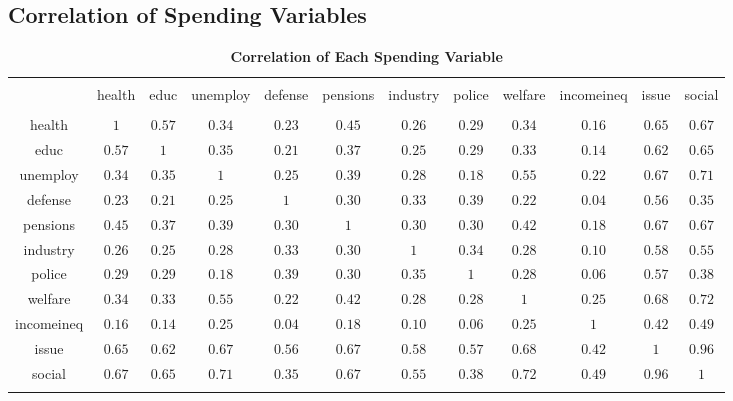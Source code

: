\documentclass[12pt, titlepage]{article}
\newcommand\tb{\textbf}
\begin{document}
\begin{landscape}
\section{Correlation of Spending Variables}

\begin{table}[H] \centering 
	\caption{\tb{Correlation of Each Spending Variable} }
	\label{Spending} 
	\begin{tabular}{ cccccccccccc} 
		\\[-1.8ex]\hline 
		\hline \\[-1.8ex] 
		& health & educ & unemploy & defense & pensions & industry & police & welfare & incomeineq & issue & social \\ 
		\hline \\[-1.8ex] 
		health & $1$ & $0.57$ & $0.34$ & $0.23$ & $0.45$ & $0.26$ & $0.29$ & $0.34$ & $0.16$ & $0.65$ & $0.67$ \\ 
		educ & $0.57$ & $1$ & $0.35$ & $0.21$ & $0.37$ & $0.25$ & $0.29$ & $0.33$ & $0.14$ & $0.62$ & $0.65$ \\ 
		unemploy & $0.34$ & $0.35$ & $1$ & $0.25$ & $0.39$ & $0.28$ & $0.18$ & $0.55$ & $0.22$ & $0.67$ & $0.71$ \\ 
		defense & $0.23$ & $0.21$ & $0.25$ & $1$ & $0.30$ & $0.33$ & $0.39$ & $0.22$ & $0.04$ & $0.56$ & $0.35$ \\ 
		pensions & $0.45$ & $0.37$ & $0.39$ & $0.30$ & $1$ & $0.30$ & $0.30$ & $0.42$ & $0.18$ & $0.67$ & $0.67$ \\ 
		industry & $0.26$ & $0.25$ & $0.28$ & $0.33$ & $0.30$ & $1$ & $0.34$ & $0.28$ & $0.10$ & $0.58$ & $0.55$ \\ 
		police & $0.29$ & $0.29$ & $0.18$ & $0.39$ & $0.30$ & $0.35$ & $1$ & $0.28$ & $0.06$ & $0.57$ & $0.38$ \\ 
		welfare & $0.34$ & $0.33$ & $0.55$ & $0.22$ & $0.42$ & $0.28$ & $0.28$ & $1$ & $0.25$ & $0.68$ & $0.72$ \\ 
		incomeineq & $0.16$ & $0.14$ & $0.25$ & $0.04$ & $0.18$ & $0.10$ & $0.06$ & $0.25$ & $1$ & $0.42$ & $0.49$ \\ 
		issue & $0.65$ & $0.62$ & $0.67$ & $0.56$ & $0.67$ & $0.58$ & $0.57$ & $0.68$ & $0.42$ & $1$ & $0.96$ \\ 
		social & $0.67$ & $0.65$ & $0.71$ & $0.35$ & $0.67$ & $0.55$ & $0.38$ & $0.72$ & $0.49$ & $0.96$ & $1$ \\ 
		\hline \\[-1.8ex] 
	\end{tabular} 
\end{table} 

\end{landscape}
\end{document}
